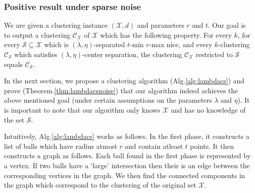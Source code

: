 \documentclass[anon,12pt]{colt2016} %
\newcommand{\mc}{\mathcal}
\begin{document}

\subsubsection{Positive result under sparse noise}
\label{section:lambdaPositiveResultSparseNoise}
We are given a clustering instance $(\mc X, d)$ and parameters $r$ and $t$. Our goal is to output a clustering $\mc C_{\mc X}$ of $\mc X$ which has the following property. For every $k$, for every $\mc S \subseteq \mc X$ which is $(\lambda, \eta)$-separated $t$-min $r$-max nice, and every $k$-clustering $\mc C_{\mc S}$ which satisfies $(\lambda, \eta)$-center separation, the clustering $\mc C_{\mc X}$ restricted to $\mc S$ equals $\mc C_{\mc S}$. 

In the next section, we propose a clustering algorithm (Alg.\ref{alg:lambdacs}) and prove (Theorem.\ref{thm:lambdacsnoise}) that our algorithm indeed achieves the above mentioned goal (under certain assumptions on the parameters $\lambda$ and $\eta$). It is important to note that our algorithm only knows $\mc X$ and has no knowledge of the set $\mc S$. 

Intuitively, Alg.\ref{alg:lambdacs} works as follows. In the first phase, it constructs a list of balls which have radius atmost $r$ and contain atleast $t$ points. It then constructs a graph as follows. Each ball found in the first phase is represented by a vertex. If two balls have a `large' intersection then their is an edge between the corresponding vertices in the graph. We then find the connected components in the graph which correspond to the clustering of the original set $\mc X$. 
\end{document}
